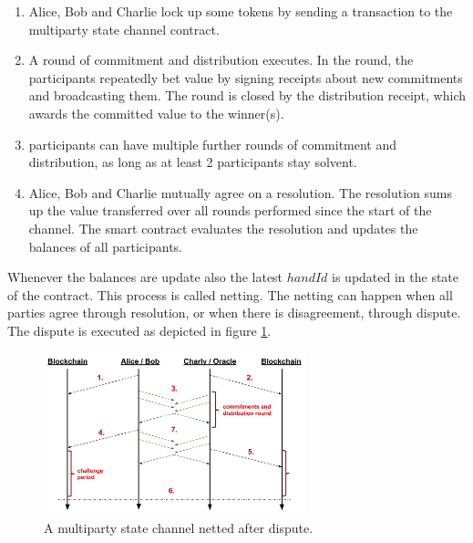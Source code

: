 \begin{enumerate}
\item Alice, Bob and Charlie lock up some tokens by sending a transaction to the multiparty state channel contract.
\item A round of commitment and distribution executes. In the round, the participants repeatedly bet value by signing receipts about new commitments and broadcasting them. The round is  closed by the distribution receipt, which awards the committed value to the winner(s).
\item participants can have multiple further rounds of commitment and distribution, as long as at least 2 participants stay solvent.
\item Alice, Bob and Charlie mutually agree on a resolution. The resolution sums up the value transferred over all rounds performed since the start of the channel. The smart contract evaluates the resolution and updates the balances of all participants. 
\end{enumerate}

Whenever the balances are update also the latest \(handId\) is updated in the state of the contract. This process is called netting. The netting can happen when all parties agree through resolution, or when there is disagreement, through dispute. The dispute is executed as depicted in figure \ref{mpc_dispute}.

\begin{figure}[!ht]
\centering
\includegraphics[width=3.0in]{images/multiDispute.png}
\caption{A multiparty state channel netted after dispute.}
\label{mpc_dispute}
\end{figure}

